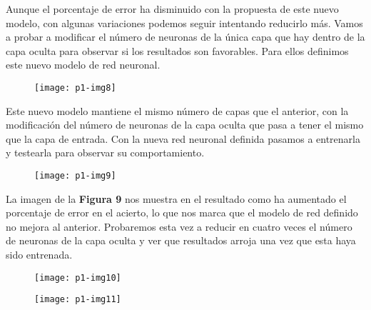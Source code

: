 \documentclass[10pt]{article}
\begin{document}
Aunque el porcentaje de error ha disminuido con la propuesta de este nuevo modelo, con algunas variaciones podemos seguir intentando reducirlo más. Vamos a probar a modificar el número de neuronas de la única capa que hay dentro de la capa oculta para observar si los resultados son favorables. Para ellos definimos este nuevo modelo de red neuronal. \\

\begin{figure}[H]
	\begin{center}
 		\texttt{[image: p1-img8]}
	\end{center} 
\end{figure}

Este nuevo modelo mantiene el mismo número de capas que el anterior, con la modificación del número de neuronas de la capa oculta que pasa a tener el mismo que la capa de entrada. Con la nueva red neuronal definida pasamos a entrenarla y testearla para observar su comportamiento. \\

\begin{figure}[H]
	\begin{center}
 		\texttt{[image: p1-img9]}
	\end{center} 
\end{figure}

La imagen de la \textbf{Figura 9} nos muestra en el resultado como ha aumentado el porcentaje de error en el acierto, lo que nos marca que el modelo de red definido no mejora al anterior. Probaremos esta vez a reducir en cuatro veces el número de neuronas de la capa oculta y ver que resultados arroja una vez que esta haya sido entrenada. \\

\begin{figure}[H]
	\begin{center}
 		\texttt{[image: p1-img10]}
	\end{center} 
\end{figure}

\begin{figure}[H]
	\begin{center}
 		\texttt{[image: p1-img11]}
	\end{center} 
\end{figure}
\end{document}
